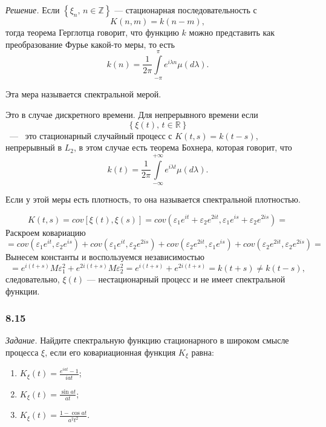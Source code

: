 \textit{Решение.}
Если $ \left\{ \xi_n, \, n \in \mathbb{Z} \right\} $ ---
стационарная последовательность с
$$K \left( n, m \right) =
  k \left( n - m \right),$$
тогда теорема Герглотца говорит,
что функцию $k$ можно представить как преобразование Фурье какой-то меры, то есть
$$k \left( n \right) =
  \frac{1}{2 \pi } \int \limits_{-\pi }^{ \pi } e^{i \lambda n} \mu \left( d \lambda \right).$$

Эта мера называется спектральной мерой.

Это в случае дискретного времени.
Для непрерывного времени если
$$ \left\{ \xi \left( t \right), \, t \in \mathbb{R} \right\} $$~---~
это стационарный случайный процесс с $K \left( t, s \right) = k \left( t - s \right) $,
непрерывный в $L_2$, в этом случае есть теорема Бохнера, которая говорит, что
$$k \left( t \right) =
  \frac{1}{2 \pi }
  \int \limits_{-\infty }^{+\infty } e^{i \lambda t} \mu \left( d \lambda \right).$$

Если у этой меры есть плотность, то она называется спектральной плотностью.

$$K \left( t, s \right) =
  cov \left[ \xi \left( t \right), \xi \left( s \right) \right] =
  cov \left(
    \varepsilon_1 e^{it} + \varepsilon_2 e^{2it}, \varepsilon_1 e^{is} + \varepsilon_2 e^{2is}
  \right) =$$
Раскроем ковариацию
$$= cov \left( \varepsilon_1 e^{it}, \varepsilon_2 e^{is} \right) +
  cov \left( \varepsilon_1 e^{it}, \varepsilon_2 e^{2is} \right) +
  cov \left( \varepsilon_2 e^{2it}, \varepsilon_1 e^{is} \right) +
  cov \left( \varepsilon_2 e^{2it}, \varepsilon_2 e^{2is} \right) =$$
Вынесем константы и воспользуемся независимостью
$$= e^{i \left( t + s \right) } M \varepsilon_1^2 + e^{2i \left( t + s \right) } M \varepsilon_2^2 =
  e^{i \left( t + s \right) } + e^{2i \left( t + s \right) } =
  k \left( t + s \right) \neq
  k \left( t - s \right),$$
следовательно, $ \xi \left( t \right) $ --- нестационарный процесс и не имеет спектральной функции.

\subsubsection*{8.15}

\textit{Задание.}
Найдите спектральную функцию стационарного в широком смысле процесса $ \xi $,
если его ковариационная функция $K_{ \xi }$ равна:
\begin{enumerate}[label=\alph*)]
  \item $K_{ \xi } \left( t \right) = \frac{e^{iat} - 1}{iat}$;
  \item $K_{ \xi } \left( t \right) = \frac{ \sin at}{at}$;
  \item $K_{ \xi } \left( t \right) = \frac{1 - \cos at}{a^2 t^2}$.
\end{enumerate}

